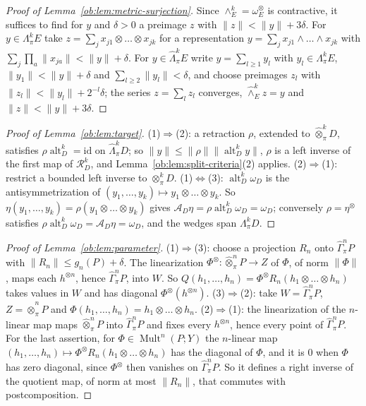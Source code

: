 \documentclass[11pt]{amsart}
\theoremstyle{definition}
\theoremstyle{remark}
\numberwithin{equation}{section}
\newcommand{\Mult}{\operatorname{Mult}}
\newcommand{\id}{\mathrm{id}}
\newcommand{\norm}[1]{\lVert #1\rVert}
\theoremstyle{plain}
\theoremstyle{definition}
\theoremstyle{plain}
\newcommand{\alt}{\operatorname{alt}}
\newcommand{\cR}{\mathcal R}
\begin{document}
\begin{proof}[Proof of Lemma~\ref{ob:lem:metric-surjection}]
Since $\wedge^k_E=\omega_E^\otimes$ is contractive, it suffices to find for $y$ and $\delta>0$ a preimage $z$ with
$\norm z<\norm y+3\delta$. For $y\in\Lambda^k_\pi E$ take $z=\sum_jx_{j1}\otimes\dots\otimes x_{jk}$ for a representation
$y=\sum_jx_{j1}\wedge\dots\wedge x_{jk}$ with $\sum_j\prod_a\norm{x_{ja}}<\norm y+\delta$. For
$y\in\widehat\Lambda^k_\pi E$ write $y=\sum_{l\ge1}y_l$ with $y_l\in\Lambda^k_\pi E$, $\norm{y_1}<\norm y+\delta$ and
$\sum_{l\ge2}\norm{y_l}<\delta$, and choose preimages $z_l$ with $\norm{z_l}<\norm{y_l}+2^{-l}\delta$; the series
$z=\sum_lz_l$ converges, $\widehat\wedge^k_Ez=y$ and $\norm z<\norm y+3\delta$.
\end{proof}

\begin{proof}[Proof of Lemma~\ref{ob:lem:target}]
(1)$\Rightarrow$(2): a retraction $\rho$, extended to $\widehat\otimes^k_\pi D$, satisfies $\rho\alt^k_D=\id$ on
$\widehat\Lambda^k_\pi D$; so $\norm y\le\norm\rho\norm{\alt^k_Dy}$, $\rho$ is a left inverse of the first map of
$\cR^k_D$, and Lemma~\ref{ob:lem:split-criteria}(2) applies. (2)$\Rightarrow$(1): restrict a bounded left inverse to
$\otimes^k_\pi D$. (1)$\Leftrightarrow$(3): $\alt^k_D\omega_D$ is the antisymmetrization of
$(y_1,\dots,y_k)\mapsto y_1\otimes\dots\otimes y_k$. So $\eta(y_1,\dots,y_k)=\rho(y_1\otimes\dots\otimes y_k)$ gives
$\mathcal A_D\eta=\rho\alt^k_D\omega_D=\omega_D$; conversely $\rho=\eta^\otimes$ satisfies
$\rho\alt^k_D\omega_D=\mathcal A_D\eta=\omega_D$, and the wedges span $\Lambda^k_\pi D$.
\end{proof}

\begin{proof}[Proof of Lemma~\ref{ob:lem:parameter}]
(1)$\Rightarrow$(3): choose a projection $R_n$ onto $\widehat\Gamma^n_\pi P$ with $\norm{R_n}\le g_n(P)+\delta$. The
linearization $\Phi^\otimes\colon\widehat\otimes^n_\pi P\to Z$ of $\Phi$, of norm $\norm\Phi$, maps each $h^{\otimes n}$,
hence $\widehat\Gamma^n_\pi P$, into $W$. So $Q(h_1,\dots,h_n)=\Phi^\otimes R_n(h_1\otimes\dots\otimes h_n)$ takes values in
$W$ and has diagonal $\Phi^\otimes(h^{\otimes n})$. (3)$\Rightarrow$(2): take $W=\widehat\Gamma^n_\pi P$, $Z=\widehat\otimes^n_\pi P$ and
$\Phi(h_1,\dots,h_n)=h_1\otimes\dots\otimes h_n$. (2)$\Rightarrow$(1): the linearization of the $n$-linear map maps
$\widehat\otimes^n_\pi P$ into $\widehat\Gamma^n_\pi P$ and fixes every $h^{\otimes n}$, hence every point of
$\widehat\Gamma^n_\pi P$. For the last assertion, for
$\Phi\in\Mult^n(P;Y)$ the $n$-linear map $(h_1,\dots,h_n)\mapsto\Phi^\otimes R_n(h_1\otimes\dots\otimes h_n)$ has the
diagonal of $\Phi$, and it is $0$ when $\Phi$ has zero diagonal, since $\Phi^\otimes$ then vanishes on
$\widehat\Gamma^n_\pi P$. So it defines a right inverse of the quotient map, of norm at most $\norm{R_n}$, that commutes
with postcomposition.
\end{proof}
\end{document}
